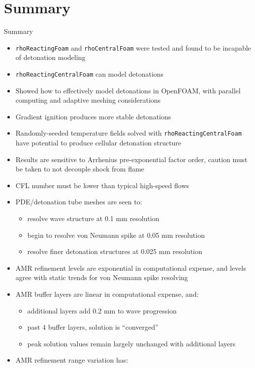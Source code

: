 \section{Summary}

\begin{frame}[allowframebreaks]{Summary}
\begin{itemize}
\item \texttt{rhoReactingFoam} and \texttt{rhoCentralFoam} were tested and found to be incapable of detonation modeling
\item \texttt{rhoReactingCentralFoam} can model detonations 
\item Showed how to effectively model detonations in OpenFOAM, with parallel computing and adaptive meshing considerations
\item Gradient ignition produces more stable detonations
\item Randomly-seeded temperature fields solved with \texttt{rhoReactingCentralFoam} have potential to produce cellular detonation structure
\item Results are sensitive to Arrhenius pre-exponential factor order, caution must be taken to not decouple shock from flame 
\item CFL number must be lower than typical high-speed flows 
\item PDE/detonation tube meshes are seen to: 
\begin{itemize}
    \item resolve wave structure at 0.1 mm resolution
    \item begin to resolve von Neumann spike at 0.05 mm resolution
    \item resolve finer detonation structures at 0.025 mm resolution 
\end{itemize}
\item AMR refinement levels are exponential in computational expense, and levels agree with static trends for von Neumann spike resolving
\item AMR buffer layers are linear in computational expense, and:
\begin{itemize}
    \item additional layers add 0.2 mm to wave progression 
    \item past 4 buffer layers, solution is ``converged''
    \item peak solution values remain largely unchanged with additional layers
\end{itemize}
\newpage
\item AMR refinement range variation has: 

\end{itemize}
\end{frame}
